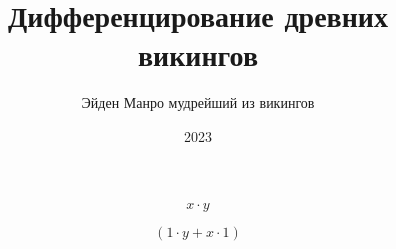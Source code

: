 \documentclass[a4paper,12pt]{article}
\title{\textbf{Дифференцирование древних викингов}}
\author{Эйден Манро мудрейший из викингов}
\date{2023}
\begin{document}
\maketitle


\begin{center}
\begin{equation}
x \cdot y
\end{equation}
\end{center}



\begin{center}
\begin{equation}
(1 \cdot y + x \cdot 1)
\end{equation}
\end{center}
\end{document}
